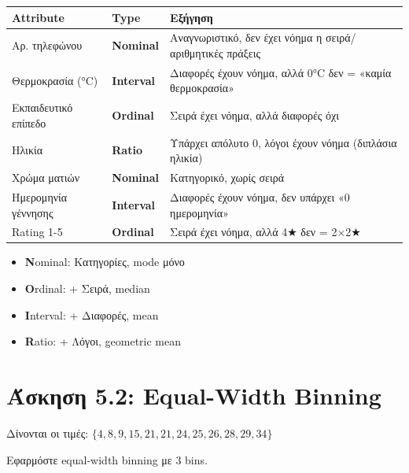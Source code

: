 \begin{center}
\begin{tabular}{llp{7cm}}
\toprule
\textbf{Attribute} & \textbf{Type} & \textbf{Εξήγηση} \\
\midrule
Αρ. τηλεφώνου & \textbf{Nominal} & Αναγνωριστικό, δεν έχει νόημα η σειρά/αριθμητικές πράξεις \\
Θερμοκρασία (°C) & \textbf{Interval} & Διαφορές έχουν νόημα, αλλά 0°C δεν = «καμία θερμοκρασία» \\
Εκπαιδευτικό επίπεδο & \textbf{Ordinal} & Σειρά έχει νόημα, αλλά διαφορές όχι \\
Ηλικία & \textbf{Ratio} & Υπάρχει απόλυτο 0, λόγοι έχουν νόημα (διπλάσια ηλικία) \\
Χρώμα ματιών & \textbf{Nominal} & Κατηγορικό, χωρίς σειρά \\
Ημερομηνία γέννησης & \textbf{Interval} & Διαφορές έχουν νόημα, δεν υπάρχει «0 ημερομηνία» \\
Rating 1-5 & \textbf{Ordinal} & Σειρά έχει νόημα, αλλά 4★ δεν = 2×2★ \\
\bottomrule
\end{tabular}
\end{center}

\begin{infobox}
\begin{itemize}
    \item \textbf{N}ominal: Κατηγορίες, mode μόνο
    \item \textbf{O}rdinal: + Σειρά, median
    \item \textbf{I}nterval: + Διαφορές, mean
    \item \textbf{R}atio: + Λόγοι, geometric mean
\end{itemize}
\end{infobox}

\section{Άσκηση 5.2: Equal-Width Binning}

\begin{formulabox}[Εκφώνηση]
Δίνονται οι τιμές: $\{4, 8, 9, 15, 21, 21, 24, 25, 26, 28, 29, 34\}$

Εφαρμόστε equal-width binning με 3 bins.
\end{formulabox}

